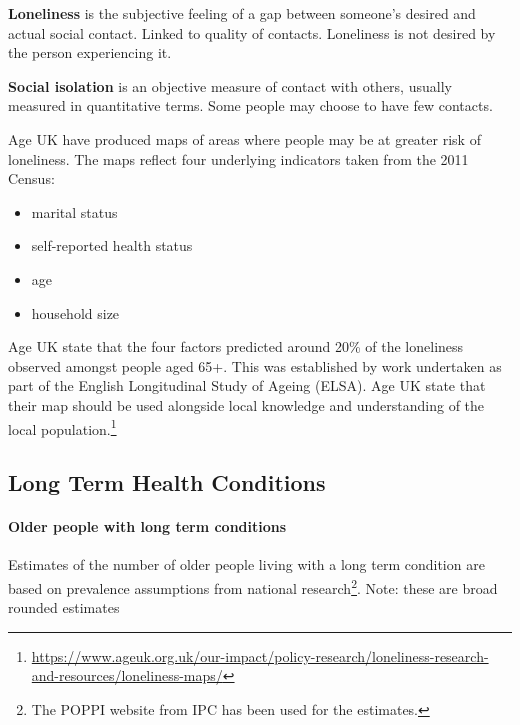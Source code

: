 \begin{tcolorbox}[title={Loneliness - identifying risks at a neighbourhood level}, colback={boxcolour}]
{\bf Loneliness} is the subjective feeling of a gap between someone's desired and actual social contact. Linked to quality of contacts. Loneliness is not desired by the person experiencing it.

{\bf Social isolation} is an objective measure of contact with others, usually measured in quantitative terms. Some people may choose to have few contacts.

Age UK have produced maps of areas where people may be at greater risk of loneliness. The maps reflect four underlying indicators taken from the 2011 Census: 

\begin{itemize}[noitemsep]
    \item marital status
    \item self-reported health status
    \item age
    \item household size
\end{itemize}

Age UK state that the four factors predicted around 20\% of the loneliness observed amongst people aged 65+. This was established by work undertaken as part of the English Longitudinal Study of Ageing (ELSA). Age UK state that their map should be used alongside local knowledge and understanding of the local population.\footnote{\tiny\url{https://www.ageuk.org.uk/our-impact/policy-research/loneliness-research-and-resources/loneliness-maps/}}
\end{tcolorbox}


\subsection{Long Term Health Conditions}
\paragraph{Older people with long term conditions} Estimates of the number of older people living with a long term condition are based on prevalence assumptions from national research\footnote{The POPPI website from IPC has been used for the estimates.}. Note: these are broad rounded estimates

